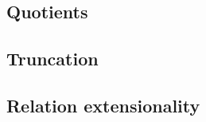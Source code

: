 \subsection{Quotients}\label{sec:equiv-relat-quot}


\subsection{Truncation}\label{sec:trunc-sets-prop}


\subsection{Relation extensionality}\label{sec:relation-extensionality}

